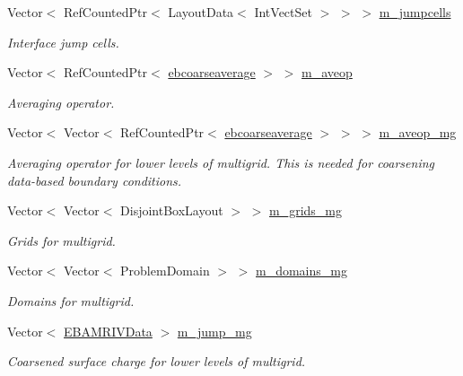 \begin{DoxyCompactItemize}
Vector$<$ Ref\+Counted\+Ptr$<$ Layout\+Data$<$ Int\+Vect\+Set $>$ $>$ $>$ \hyperlink{classmfconductivityopfactory_a054fc41f659ad1563a369258f4036a92}{m\+\_\+jumpcells}
\begin{DoxyCompactList}\small\item\em Interface jump cells. \end{DoxyCompactList}\item 
Vector$<$ Ref\+Counted\+Ptr$<$ \hyperlink{classebcoarseaverage}{ebcoarseaverage} $>$ $>$ \hyperlink{classmfconductivityopfactory_a5475e5a9169889861b7cf13d310c8f56}{m\+\_\+aveop}
\begin{DoxyCompactList}\small\item\em Averaging operator. \end{DoxyCompactList}\item 
Vector$<$ Vector$<$ Ref\+Counted\+Ptr$<$ \hyperlink{classebcoarseaverage}{ebcoarseaverage} $>$ $>$ $>$ \hyperlink{classmfconductivityopfactory_a460e0030717083a791c637bfb6745af3}{m\+\_\+aveop\+\_\+mg}
\begin{DoxyCompactList}\small\item\em Averaging operator for lower levels of multigrid. This is needed for coarsening data-\/based boundary conditions. \end{DoxyCompactList}\item 
Vector$<$ Vector$<$ Disjoint\+Box\+Layout $>$ $>$ \hyperlink{classmfconductivityopfactory_a86db655fbf06804296551521af5fe3d3}{m\+\_\+grids\+\_\+mg}
\begin{DoxyCompactList}\small\item\em Grids for multigrid. \end{DoxyCompactList}\item 
Vector$<$ Vector$<$ Problem\+Domain $>$ $>$ \hyperlink{classmfconductivityopfactory_a5b9677838aa95269146a6d13b0e59056}{m\+\_\+domains\+\_\+mg}
\begin{DoxyCompactList}\small\item\em Domains for multigrid. \end{DoxyCompactList}\item 
Vector$<$ \hyperlink{type__definitions_8H_a6b8fa905d55cbb491b52180386f0e0c1}{E\+B\+A\+M\+R\+I\+V\+Data} $>$ \hyperlink{classmfconductivityopfactory_a3004c914d772c7b76fa6a7d6040ab010}{m\+\_\+jump\+\_\+mg}
\begin{DoxyCompactList}\small\item\em Coarsened surface charge for lower levels of multigrid. \end{DoxyCompactList}\item 

\end{DoxyCompactItemize}

